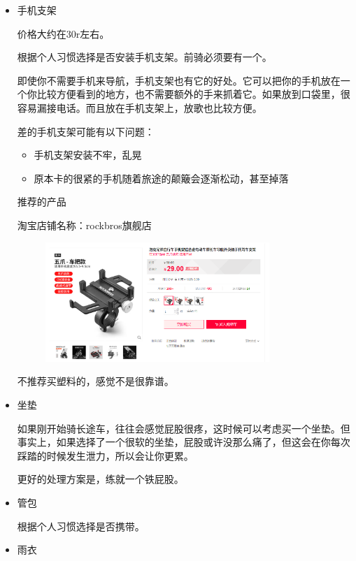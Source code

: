 \documentclass{ctexbook}
\begin{document}
\begin{itemize}
        \item 手机支架  
    
        价格大约在30r左右。

        根据个人习惯选择是否安装手机支架。前骑必须要有一个。

        即使你不需要手机来导航，手机支架也有它的好处。它可以把你的手机放在一个你比较方便看到的地方，也不需要额外的手来抓着它。如果放到口袋里，很容易漏接电话。而且放在手机支架上，放歌也比较方便。

        差的手机支架可能有以下问题：
        \begin{itemize}
            \item 手机支架安装不牢，乱晃
            \item 原本卡的很紧的手机随着旅途的颠簸会逐渐松动，甚至掉落
        \end{itemize}

        推荐的产品

        淘宝店铺名称：rockbros旗舰店

        \begin{figure}[H]
            \begin{center}
            \includegraphics[width = 0.8\textwidth]{fig/洛克兄弟_手机支架.png}
            \end{center}
        \end{figure}
        不推荐买塑料的，感觉不是很靠谱。

        \item 坐垫
        
        如果刚开始骑长途车，往往会感觉屁股很疼，这时候可以考虑买一个坐垫。但事实上，如果选择了一个很软的坐垫，屁股或许没那么痛了，但这会在你每次踩踏的时候发生泄力，所以会让你更累。
        
        更好的处理方案是，练就一个铁屁股。
        \item 管包 
        
        根据个人习惯选择是否携带。
        \item 雨衣    
        

\end{itemize}
\end{document}
